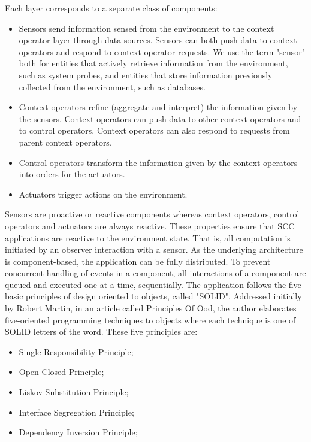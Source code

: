 \documentclass{acm_proc_article-sp}
\begin{document}
Each layer corresponds to a separate class of components: 
\begin{itemize}
\item Sensors send information sensed from the environment to the context operator layer through data sources. Sensors can both push data to context operators and respond to context operator requests. We use the term "sensor" both for entities that actively retrieve information from the environment, such as system probes, and entities that store information previously collected from the environment, such as databases.
\item Context operators refine (aggregate and interpret) the information given by the sensors. Context operators can push data to other context operators and to control operators. Context operators can also respond to requests from parent context operators. 
\item Control operators transform the information given by the context operators into orders for the actuators. 
\item Actuators trigger actions on the environment.
\end{itemize}
Sensors are proactive or reactive components whereas context operators, control operators and actuators are always reactive. These properties ensure that SCC applications are reactive to the environment state. That is, all computation is initiated by an observer interaction with a sensor.
\newline
\newline
As the underlying architecture is component-based, the application can be fully distributed. To prevent concurrent handling of events in a component, all interactions of a component are queued and executed one at a time, sequentially.
\newline
\newline
The application follows the five basic principles of design oriented to objects, called "SOLID". Addressed initially by Robert Martin, in an article called Principles Of Ood, the author elaborates five-oriented programming techniques to objects where each technique is one of SOLID letters of the word. These five principles are:
\begin{itemize}
\item Single Responsibility Principle;
\item Open Closed Principle;
\item Liskov Substitution Principle;
\item Interface Segregation Principle;
\item Dependency Inversion Principle;
\end{itemize} 
%
\end{document}
